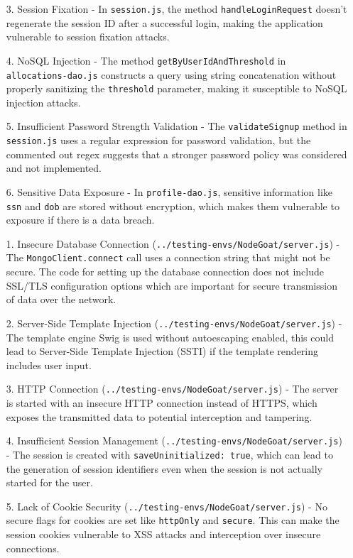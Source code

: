 \begin{enumerate}
  \item[3.] Session Fixation - In \texttt{session.js}, the method \texttt{handleLoginRequest} doesn't regenerate the session ID after a successful login, making the application vulnerable to session fixation attacks.
  \item[4.] NoSQL Injection - The method \texttt{getByUserIdAndThreshold} in \texttt{allocations-dao.js} constructs a query using string concatenation without properly sanitizing the \texttt{threshold} parameter, making it susceptible to NoSQL injection attacks.
  \item[5.] Insufficient Password Strength Validation - The \texttt{validateSignup} method in \texttt{session.js} uses a regular expression for password validation, but the commented out regex suggests that a stronger password policy was considered and not implemented.
  \item[6.] Sensitive Data Exposure - In \texttt{profile-dao.js}, sensitive information like \texttt{ssn} and \texttt{dob} are stored without encryption, which makes them vulnerable to exposure if there is a data breach. \\
  \item[1.] Insecure Database Connection (\texttt{../testing-envs/NodeGoat/server.js}) - The \texttt{MongoClient.connect} call uses a connection string that might not be secure. The code for setting up the database connection does not include SSL/TLS configuration options which are important for secure transmission of data over the network.
  \item[2.] Server-Side Template Injection (\texttt{../testing-envs/NodeGoat/server.js}) - The template engine Swig is used without autoescaping enabled, this could lead to Server-Side Template Injection (SSTI) if the template rendering includes user input.
  \item[3.] HTTP Connection (\texttt{../testing-envs/NodeGoat/server.js}) - The server is started with an insecure HTTP connection instead of HTTPS, which exposes the transmitted data to potential interception and tampering.
  \item[4.] Insufficient Session Management (\texttt{../testing-envs/NodeGoat/server.js}) - The session is created with \texttt{saveUninitialized: true}, which can lead to the generation of session identifiers even when the session is not actually started for the user.
  \item[5.] Lack of Cookie Security (\texttt{../testing-envs/NodeGoat/server.js}) - No secure flags for cookies are set like \texttt{httpOnly} and \texttt{secure}. This can make the session cookies vulnerable to XSS attacks and interception over insecure connections.

\end{enumerate}
